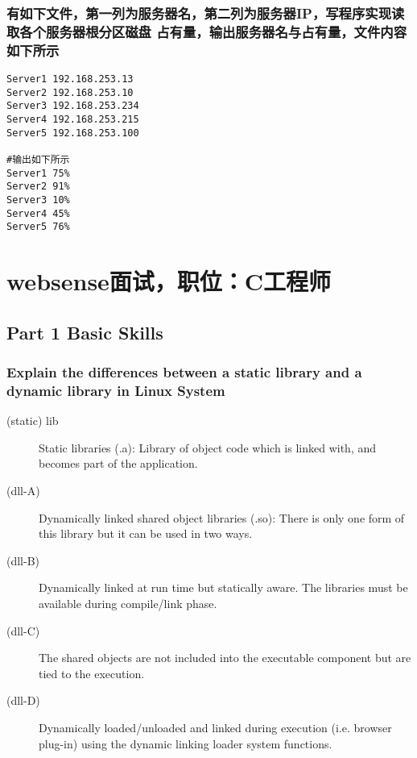 \documentclass{article}
\begin{document}
\subsubsection{有如下文件，第一列为服务器名，第二列为服务器IP，写程序实现读取各个服务器根分区磁盘
占有量，输出服务器名与占有量，文件内容如下所示}
\begin{verbatim}
Server1 192.168.253.13
Server2 192.168.253.10
Server3 192.168.253.234
Server4 192.168.253.215
Server5 192.168.253.100

#输出如下所示
Server1 75%
Server2 91%
Server3 10%
Server4 45%
Server5 76%
\end{verbatim}


\section{websense面试，职位：C工程师}
\subsection{Part 1 Basic Skills}
\subsubsection{Explain the differences between a static library and a dynamic library in Linux System}
\begin{description}
\item[(static) lib]Static libraries (.a): Library of object code which is linked with, and becomes part of the application.
\item[(dll-A)]Dynamically linked shared object libraries (.so): There is only one form of this library but it can be used in two ways.
\item[(dll-B)]Dynamically linked at run time but statically aware. The libraries must be available during compile/link phase. 
\item[(dll-C)]The shared objects are not included into the executable component but are tied to the execution.
\item[(dll-D)]Dynamically loaded/unloaded and linked during execution (i.e. browser plug-in) using the dynamic linking loader system functions.
\end{description}
\end{document}
